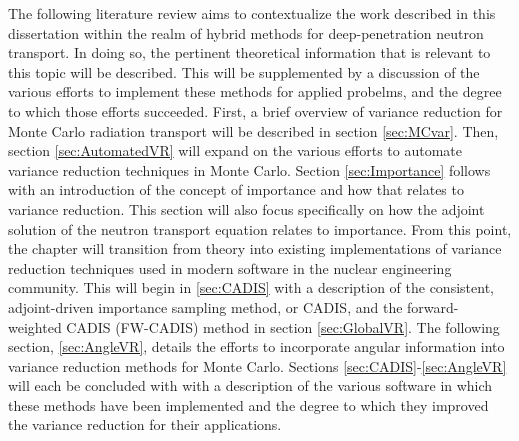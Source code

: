 The following literature review aims to contextualize the work described in this
dissertation within the realm of hybrid methods for deep-penetration
neutron transport. In doing
so, the pertinent theoretical information that is relevant to this
topic will be described.
This will be supplemented by a discussion of the various efforts to implement
these methods for applied probelms, and the degree to which those efforts
succeeded.
First, a brief overview of variance reduction for Monte Carlo radiation transport
will be described in section \ref{sec:MCvar}.
Then, section \ref{sec:AutomatedVR} will expand on the
various efforts to automate variance reduction techniques in Monte Carlo.
Section \ref{sec:Importance} follows with an introduction of the concept of
importance and how that relates to variance reduction. This section will also
focus specifically on how the adjoint solution of the neutron transport equation
relates to importance.
From this point, the chapter will transition
from theory into existing implementations
of variance reduction techniques used in modern software in the nuclear
engineering community. This will begin in \ref{sec:CADIS} with a description of
the consistent, adjoint-driven importance sampling method, or CADIS, and
the forward-weighted CADIS (FW-CADIS) method in section \ref{sec:GlobalVR}.
The following section, \ref{sec:AngleVR}, details the efforts to incorporate
angular information into variance reduction methods for Monte Carlo.
Sections \ref{sec:CADIS}-\ref{sec:AngleVR} will each be
concluded with with a description of the
various software in which these methods have been implemented and the degree to
which they improved the variance reduction for their applications.
